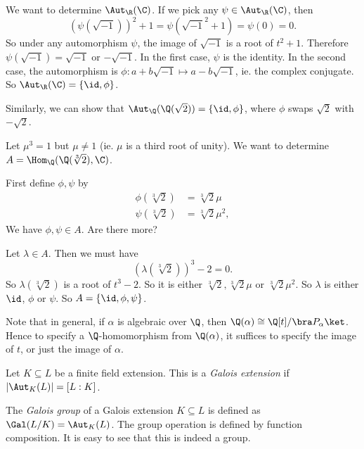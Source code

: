 \documentclass[a4paper]{article}
\begin{document}
\begin{eg}
  We want to determine $\Aut_\R(\C)$. If we pick any $\psi\in \Aut_\R(\C)$, then
  \[
    (\psi(\sqrt{-1}))^2 + 1 = \psi(\sqrt{-1}^2 + 1) = \psi(0) = 0.
  \]
  So under any automorphism $\psi$, the image of $\sqrt{-1}$ is a root of $t^2 + 1$. Therefore $\psi(\sqrt{-1}) = \sqrt{-1}$ or $-\sqrt{-1}$. In the first case, $\psi$ is the identity. In the second case, the automorphism is $\phi: a  + b\sqrt{-1} \mapsto a - b\sqrt{-1}$, ie. the complex conjugate. So $\Aut_\R(\C) = \{\id, \phi\}$.

  Similarly, we can show that $\Aut_\Q(\Q(\sqrt{2})) = \{\id, \phi\}$, where $\phi$ swaps $\sqrt{2}$ with $-\sqrt{2}$.
\end{eg}

\begin{eg}
  Let $\mu^3 = 1$ but $\mu \not= 1$ (ie. $\mu$ is a third root of unity). We want to determine $A = \Hom_\Q(\Q(\sqrt[3]{2}), \C)$.

  First define $\phi, \psi$ by
  \begin{align*}
    \phi(\sqrt[3]{2}) &= \sqrt[3]{2}\mu\\
    \psi(\sqrt[3]{2}) &= \sqrt[3]{2}\mu^2,
  \end{align*}
  We have $\phi, \psi \in A$. Are there more?

  Let $\lambda \in A$. Then we must have
  \[
    (\lambda(\sqrt[3]{2}))^3 - 2 = 0.
  \]
  So $\lambda(\sqrt[3]{2})$ is a root of $t^3 - 2$. So it is either $\sqrt[3]{2}, \sqrt[3]{2}\mu$ or $\sqrt[3]{2}\mu^2$. So $\lambda$ is either $\id$, $\phi$ or $\psi$. So $A = \{\id, \phi, \psi\}$.
\end{eg}
Note that in general, if $\alpha$ is algebraic over $\Q$, then $\Q(\alpha) \cong \Q[t]/\bra P_\alpha\ket $. Hence to specify a $\Q$-homomorphism from $\Q(\alpha)$, it suffices to specify the image of $t$, or just the image of $\alpha$.

\begin{defi}
  Let $K\subseteq L$ be a finite field extension. This is a \emph{Galois extension} if $|\Aut_K(L)| = [L:K]$.
\end{defi}

\begin{defi}
  The \emph{Galois group} of a Galois extension $K\subseteq L$ is defined as $\Gal(L/K) = \Aut_K(L)$. The group operation is defined by function composition. It is easy to see that this is indeed a group.
\end{defi}
\end{document}
